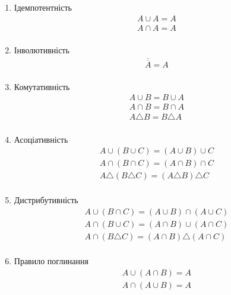 \begin{multicols}{2}
    \begin{enumerate}
        \item Ідемпотентність
            \begin{gather*}
                A \cup A = A \\
                A \cap A = A \\
            \end{gather*}
        
        \item Інволютивність
        \begin{gather*}
            \overline{\overline{A}} = A\\
        \end{gather*}
        
        \item Комутативність
        \begin{gather*}
            A \cup B = B \cup A\\
            A \cap B = B \cap A\\
            A \triangle B = B \triangle A\\
        \end{gather*}
            
        \item Асоціативність
        \begin{gather*}
            A \cup (B \cup C) = (A \cup B) \cup C\\
            A \cap (B \cap C) = (A \cap B) \cap C\\
            A \triangle (B \triangle C) = (A \triangle B) \triangle C\\
        \end{gather*}
        
        \item Дистрибутивність
            \begin{gather*}
                A \cup (B \cap C) = (A \cup B) \cap (A \cup C)\\
                A \cap (B \cup C) = (A \cap B) \cup (A \cap C)\\
                A \cap (B \triangle C) = (A \cap B) \triangle (A \cap C)\\
            \end{gather*}
        
        \item Правило поглинання
            \begin{gather*}
                A \cup (A \cap B) = A\\
                A \cap (A \cup B) = A\\
            \end{gather*}
            

\end{enumerate}
\end{multicols}
